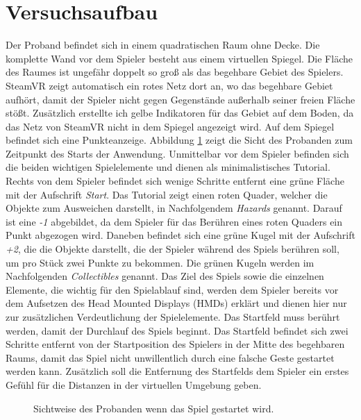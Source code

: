 \section{Versuchsaufbau}
Der Proband befindet sich in einem quadratischen Raum ohne Decke. Die komplette Wand vor dem Spieler besteht aus einem virtuellen Spiegel. Die Fläche des Raumes ist ungefähr doppelt so groß als das begehbare Gebiet des Spielers. SteamVR zeigt automatisch ein rotes Netz dort an, wo das begehbare Gebiet aufhört, damit der Spieler nicht gegen Gegenstände außerhalb seiner freien Fläche stößt. Zusätzlich erstellte ich gelbe Indikatoren für das Gebiet auf dem Boden, da das Netz von SteamVR nicht in dem Spiegel angezeigt wird. Auf dem Spiegel befindet sich eine Punkteanzeige.
Abbildung \ref{fig:povSetup} zeigt die Sicht des Probanden zum Zeitpunkt des Starts der Anwendung. Unmittelbar vor dem Spieler befinden sich die beiden wichtigen Spielelemente und dienen als minimalistisches Tutorial. Rechts von dem Spieler befindet sich wenige Schritte entfernt eine grüne Fläche mit der Aufschrift \textit{Start}. Das Tutorial zeigt einen roten Quader, welcher die Objekte zum Ausweichen darstellt, in Nachfolgendem \textit{Hazards} genannt. Darauf ist eine \textit{-1} abgebildet, da dem Spieler für das Berühren eines roten Quaders ein Punkt abgezogen wird. Daneben befindet sich eine grüne Kugel mit der Aufschrift \textit{+2}, die die Objekte darstellt, die der Spieler während des Spiels berühren soll, um pro Stück zwei Punkte zu bekommen. Die grünen Kugeln werden im Nachfolgenden \textit{Collectibles} genannt. Das Ziel des Spiels sowie die einzelnen Elemente, die wichtig für den Spielablauf sind, werden dem Spieler bereits vor dem Aufsetzen des Head Mounted Displays (HMDs) erklärt und dienen hier nur zur zusätzlichen Verdeutlichung der Spielelemente. 
Das Startfeld muss berührt werden, damit der Durchlauf des Spiels beginnt. Das Startfeld befindet sich zwei Schritte entfernt von der Startposition des Spielers in der Mitte des begehbaren Raums, damit das Spiel nicht unwillentlich durch eine falsche Geste gestartet werden kann. Zusätzlich soll die Entfernung des Startfelds dem Spieler ein erstes Gefühl für die Distanzen in der virtuellen Umgebung geben.

\begin{figure}[h]
  \caption[Aktuelles Setup der Anwendung]{Sichtweise des Probanden wenn das Spiel gestartet wird.}
  \label{fig:povSetup}
\end{figure}

